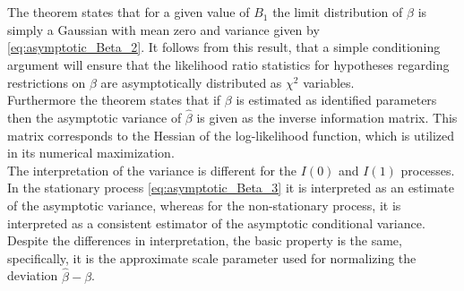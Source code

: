 \noindent The theorem states that for a given value of $B_1$ the limit distribution of $\hat{\beta}$ is simply a Gaussian with mean zero and variance given by \eqref{eq:asymptotic_Beta_2}. It follows from this result, that a simple conditioning argument will ensure that the likelihood ratio statistics for hypotheses regarding restrictions on $\beta$ are asymptotically distributed as $\chi^2$ variables.\\ 

\noindent Furthermore the theorem states that if $\beta$ is estimated as identified parameters then the asymptotic variance of $\hat{\beta}$ is given as the inverse information matrix. This matrix corresponds to the Hessian of the log-likelihood function, which is utilized in its numerical maximization.\\

\noindent The interpretation of the variance is different for the $I(0)$ and $I(1)$ processes. In the stationary process \eqref{eq:asymptotic_Beta_3} it is interpreted as an estimate of the asymptotic variance, whereas for the non-stationary process, it is interpreted as a consistent estimator of the asymptotic conditional variance. Despite the differences in interpretation, the basic property is the same, specifically, it is the approximate scale parameter used for normalizing the deviation $\hat{\beta} - \beta$.\\



